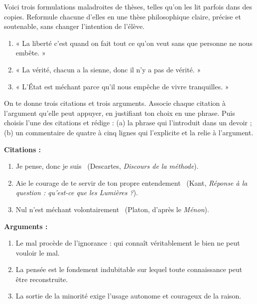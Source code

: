 \documentclass[11pt]{article}
\begin{document}
\begin{exercice}
Voici trois formulations maladroites de thèses, telles qu'on les lit parfois dans des copies. Reformule chacune d'elles en une thèse philosophique claire, précise et soutenable, sans changer l'intention de l'élève.

\begin{enumerate}
\item « La liberté c'est quand on fait tout ce qu'on veut sans que personne ne nous embête. »
\item « La vérité, chacun a la sienne, donc il n'y a pas de vérité. »
\item « L'État est méchant parce qu'il nous empêche de vivre tranquilles. »
\end{enumerate}
\end{exercice}

\begin{exercice}
On te donne trois citations et trois arguments. Associe chaque citation à l'argument qu'elle peut appuyer, en justifiant ton choix en une phrase. Puis choisis l'une des citations et rédige : (a) la phrase qui l'introduit dans un devoir ; (b) un commentaire de quatre à cinq lignes qui l'explicite et la relie à l'argument.

\textbf{Citations :}
\begin{enumerate}
\item \guillemotleft Je pense, donc je suis \guillemotright\ (Descartes, \emph{Discours de la méthode}).
\item \guillemotleft Aie le courage de te servir de ton propre entendement \guillemotright\ (Kant, \emph{Réponse à la question : qu'est-ce que les Lumières ?}).
\item \guillemotleft Nul n'est méchant volontairement \guillemotright\ (Platon, d'après le \emph{Ménon}).
\end{enumerate}

\textbf{Arguments :}
\begin{enumerate}
\item[A.] Le mal procède de l'ignorance : qui connaît véritablement le bien ne peut vouloir le mal.
\item[B.] La pensée est le fondement indubitable sur lequel toute connaissance peut être reconstruite.
\item[C.] La sortie de la minorité exige l'usage autonome et courageux de la raison.
\end{enumerate}
\end{exercice}
\end{document}
